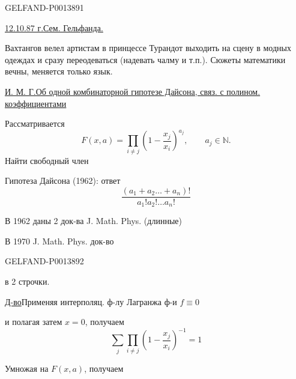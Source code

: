 \begin{GelfandAdjacentEvidence}{GELFAND-P001389}{1}

\uline{12.10.87 г.}\qquad \uline{Сем. Гельфанда.}

Вахтангов велел артистам в принцессе Турандот выходить на сцену в модных одеждах и сразу переодеваться (надевать чалму и т.п.). Сюжеты математики вечны, меняется только язык.

\uline{И. М. Г.}\quad \uline{Об одной комбинаторной гипотезе Дайсона, связ. с полином. коэффициентами}


Рассматривается
\begin{equation*}
F(x,a)=\prod_{i\ne j}\left(1-\frac{x_j}{x_i}\right)^{a_j},
\qquad a_j\in\mathbb N.
\tag{1}
\end{equation*}
Найти свободный член

Гипотеза Дайсона (1962): ответ
\begin{equation*}
\frac{(a_1+a_2\ldots+a_n)!}{a_1!a_2!\ldots a_n!}
\tag{2}
\end{equation*}

В 1962 даны 2 док-ва J. Math. Phys. (длинные)

В 1970 J. Math. Phys. док-во
\end{GelfandAdjacentEvidence}
\begin{GelfandAdjacentEvidence}{GELFAND-P001389}{2}

в 2 строчки.

\uline{Д-во}\quad Применяя интерполяц. ф-лу Лагранжа ф-и \(f\equiv0\)
\end{GelfandAdjacentEvidence}

и полагая затем \(x=0\), получаем
\begin{equation*}
\sum_j\prod_{i\ne j}\left(1-\frac{x_j}{x_i}\right)^{-1}=1
\tag{3}
\end{equation*}

Умножая на \(F(x,a)\), получаем


